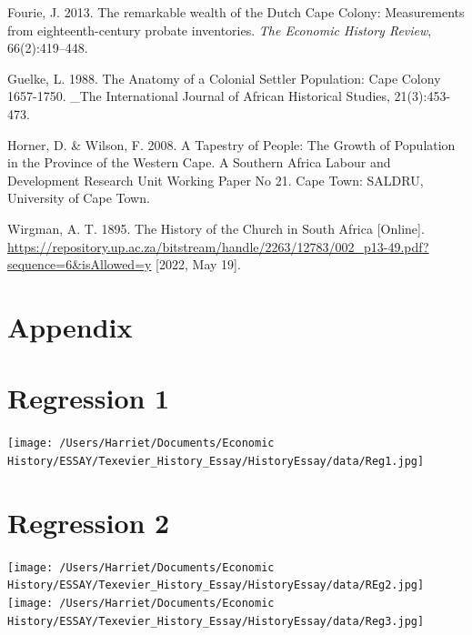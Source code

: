 \documentclass[11pt,preprint, authoryear]{elsarticle}
\numberwithin{equation}{section}
\numberwithin{figure}{section}
\numberwithin{table}{section}
\begin{document}
Fourie, J. 2013. The remarkable wealth of the Dutch Cape Colony:
Measurements from eighteenth-century probate inventories. \emph{The
Economic History Review}, 66(2):419--448.

Guelke, L. 1988. The Anatomy of a Colonial Settler Population: Cape
Colony 1657-1750. \_The International Journal of African Historical
Studies, 21(3):453-473.

Horner, D. \& Wilson, F. 2008. A Tapestry of People: The Growth of
Population in the Province of the Western Cape. A Southern Africa Labour
and Development Research Unit Working Paper No 21. Cape Town: SALDRU,
University of Cape Town.

Wirgman, A. T. 1895. The History of the Church in South Africa
{[}Online{]}.
\url{https://repository.up.ac.za/bitstream/handle/2263/12783/002_p13-49.pdf?sequence=6\&isAllowed=y}
{[}2022, May 19{]}.

\hypertarget{appendix}{%
\section*{Appendix}\label{appendix}}

\hypertarget{regression-1}{%
\section*{Regression 1}\label{regression-1}}

\texttt{[image: /Users/Harriet/Documents/Economic History/ESSAY/Texevier\_History\_Essay/HistoryEssay/data/Reg1.jpg]}
\newpage

\hypertarget{regression-2}{%
\section*{Regression 2}\label{regression-2}}

\texttt{[image: /Users/Harriet/Documents/Economic History/ESSAY/Texevier\_History\_Essay/HistoryEssay/data/REg2.jpg]}
\newpage
\texttt{[image: /Users/Harriet/Documents/Economic History/ESSAY/Texevier\_History\_Essay/HistoryEssay/data/Reg3.jpg]}


\end{document}
